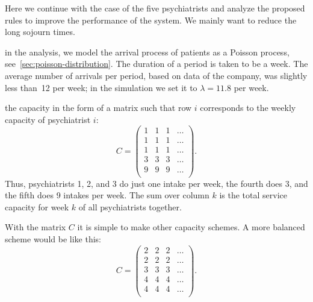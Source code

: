 Here we continue with the case of the five psychiatrists and analyze the proposed rules to improve the performance of the system.
We mainly want to reduce the long sojourn times.

 in the analysis, we model the arrival process of patients as a Poisson process, see~\cref{sec:poisson-distribution}.
The duration of a period is taken to be a week.
The average number of arrivals per period, based on data of the company, was slightly less than~12 per week; in the simulation we set it to $\lambda= 11.8$ per week.

 the capacity in the form of a matrix such that row $i$ corresponds to the weekly capacity of psychiatrist $i$:
\begin{equation*}
C = 
 \begin{pmatrix}
 1 & 1 & 1 & \ldots\\
 1 & 1 & 1 & \ldots\\
 1 & 1 & 1 & \ldots\\
 3 & 3 & 3 & \ldots\\
 9 & 9 & 9 & \ldots\\
 \end{pmatrix}.
\end{equation*}
Thus, psychiatrists 1, 2, and 3 do just one intake per week, the
fourth does 3, and the fifth does 9 intakes per week. The sum over
column $k$ is the total service capacity for week $k$ of all
psychiatrists together.

With the matrix $C$ it is simple to make other capacity schemes. A
more balanced scheme would be like this:
\begin{equation*}
C = 
 \begin{pmatrix}
 2 & 2 & 2 & \ldots\\
 2 & 2 & 2 & \ldots\\
 3 & 3 & 3 & \ldots\\
 4 & 4 & 4 & \ldots\\
 4 & 4 & 4 & \ldots\\
 \end{pmatrix}.
\end{equation*}

